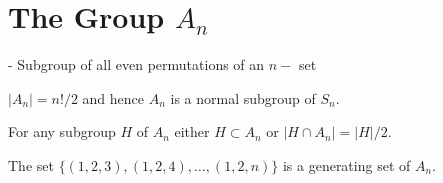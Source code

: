 \section{The Group $A_n$}
- Subgroup of all even permutations of an $n-$ set

\begin{theorem}[Properties of $A_n$]
	\item 
	$|A_n|=n!/2$ and hence $A_n$ is a normal subgroup of $S_n$.
	\item 
	For any subgroup $H$ of $A_n$ either $H\subset A_n$ or $|H\cap A_n|=|H|/2$.
	\item 
	The set $\{(1,2,3),(1,2,4),\dots,(1,2,n)\}$ is a generating set of $A_n$.
\end{theorem}



